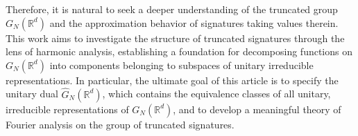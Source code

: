 \documentclass[pdflatex,sn-mathphys-num]{sn-jnl}
\theoremstyle{thmstyletwo}
\theoremstyle{thmstyleone}
\theoremstyle{thmstyletwo}
\newcommand{\R}{\mathbb{R}}
\begin{document}
Therefore, it is natural to seek a deeper understanding of the truncated group $G_N(\R^d)$ and the approximation behavior of signatures taking values therein. This work aims to investigate the structure of truncated signatures through the lens of harmonic analysis, establishing a foundation for decomposing functions on $G_N(\R^d)$ into components belonging to subspaces of unitary irreducible representations. In particular, the ultimate goal of this article is to specify the unitary dual $\hat G_N(\R^d)$, which contains the equivalence classes of all unitary, irreducible representations of $G_N(\R^d)$, and to develop a meaningful theory of Fourier analysis on the group of truncated signatures. 
\end{document}
